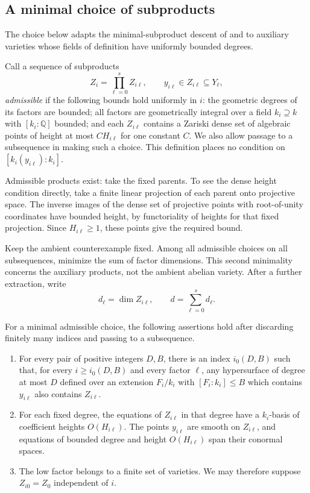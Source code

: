 \subsection{A minimal choice of subproducts}

The choice below adapts the minimal-subproduct descent of
\cite[Section~3]{Remond2005Vojta} and \cite[Section~2]{Dill2020}
to auxiliary varieties whose fields of definition have uniformly bounded
degrees.

Call a sequence of subproducts
\[
 Z_i=\prod_{\ell=0}^s Z_{i\ell},\qquad
 y_{i\ell}\in Z_{i\ell}\subseteq Y_\ell,
\]
\emph{admissible} if the following bounds hold uniformly in $i$:
the geometric degrees of its factors are bounded; all factors are
geometrically integral over a field $k_i\supseteq k$ with
$[k_i:\mathbb Q]$ bounded; and each $Z_{i\ell}$ contains a Zariski dense
set of algebraic points of height at most $C H_{i\ell}$ for one constant
$C$.  We also allow passage to a subsequence in making such a choice.
This definition places no condition on $[k_i(y_{i\ell}):k_i]$.

Admissible products exist: take the fixed parents.  To see the dense
height condition directly, take a finite linear projection of each
parent onto projective space.  The inverse images of the dense set
of projective points with root-of-unity coordinates have bounded
height, by functoriality of heights for that fixed projection.
Since $H_{i\ell}\geq1$, these points give the required bound.

Keep the ambient counterexample fixed.  Among all admissible choices on
all subsequences, minimize the sum of factor dimensions.  This second
minimality concerns the auxiliary products, not the ambient abelian
variety.  After a further extraction, write
\[
 d_\ell=\dim Z_{i\ell},\qquad d=\sum_{\ell=0}^s d_\ell.
\]

\begin{proposition}\label{prop:minimal-products}
For a minimal admissible choice, the following assertions hold after
discarding finitely many indices and passing to a subsequence.
\begin{enumerate}
\item For every pair of positive integers $D,B$, there is an index
$i_0(D,B)$ such that, for every $i\ge i_0(D,B)$ and every factor
$\ell$, any hypersurface of degree at most $D$ defined over an
extension $F_i/k_i$ with $[F_i:k_i]\le B$ which contains
$y_{i\ell}$ also contains $Z_{i\ell}$.
\item For each fixed degree, the equations of $Z_{i\ell}$ in that
degree have a $k_i$-basis of coefficient heights $O(H_{i\ell})$.
The points $y_{i\ell}$ are smooth on $Z_{i\ell}$, and equations of
bounded degree and height $O(H_{i\ell})$ span their conormal spaces.
\item The low factor belongs to a finite set of varieties.  We may
therefore suppose $Z_{i0}=Z_0$ independent of $i$.
\end{enumerate}
\end{proposition}

